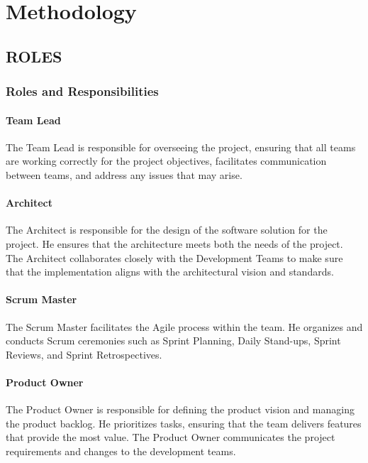 \hypertarget{methodology}{
\section{Methodology}\label{methodology}}

\hypertarget{roles}{
\subsection{ROLES}\label{roles}}

\hypertarget{roles-res}{
\subsubsection{Roles and Responsibilities}\label{roles-res}}

\hypertarget{teamlead}{
\paragraph{Team Lead}\label{teamlead}}
The Team Lead is responsible for overseeing the project, ensuring that all teams are working correctly for the project objectives, facilitates communication between teams, and address any issues that may arise.

\hypertarget{architec}{
\paragraph{Architect}\label{architec}}
The Architect is responsible for the design of the software solution for the project. He ensures that the architecture meets both the needs of the project. The Architect collaborates closely with the Development Teams to make sure that the implementation aligns with the architectural vision and standards.

\hypertarget{scrummaster}{
\paragraph{Scrum Master}\label{scrummaster}}
The Scrum Master facilitates the Agile process within the team. He organizes and conducts Scrum ceremonies such as Sprint Planning, Daily Stand-ups, Sprint Reviews, and Sprint Retrospectives.

\hypertarget{po}{
\paragraph{Product Owner}\label{po}}
The Product Owner is responsible for defining the product vision and managing the product backlog. He prioritizes tasks, ensuring that the team delivers features that provide the most value. The Product Owner communicates the project requirements and changes to the development teams.

